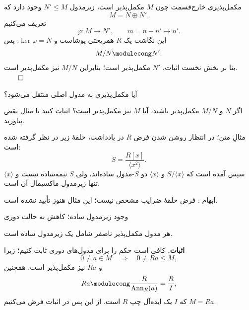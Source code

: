 \begin{frame}[t]{مکمل‌پذیری خارج‌قسمت}
    \label{lec06:complemented-quotient}
    چون \(M\) مکمل‌پذیر است، زیرمدول \(N'\leqslant M\) وجود دارد که
    \[
        M=N\oplus N'.
    \]
    تعریف می‌کنیم
    \[
        \varphi:M\longrightarrow N',\qquad m=n+n'\longmapsto n'.
    \]
    این نگاشت یک \(R\)-همریختی پوشاست و \(\ker\varphi=N\). پس
    \[
        M/N\modulecong N'.
    \]
    بنا بر بخش نخست اثبات، \(N'\) مکمل‌پذیر است؛ بنابراین \(M/N\) نیز مکمل‌پذیر است.
    \hfill\(\qed\)
\end{frame}

\begin{frame}[t]{آیا مکمل‌پذیری به مدول اصلی منتقل می‌شود؟}
    \label{lec06:extension-counterexample-pending}
    \begin{question}
        اگر \(N\) و \(M/N\) مکمل‌پذیر باشند، آیا \(M\) نیز مکمل‌پذیر است؟
        اثبات کنید یا مثال نقض بیاورید.
    \end{question}
    \begin{block}{مثالِ متن؛ در انتظار روشن شدن فرض \(R\)}
        در یادداشت، حلقهٔ زیر در نظر گرفته شده است:
        \[
            S=\frac{R[x]}{\langle x^2\rangle}.
        \]
        سپس آمده است که \(S/\langle x\rangle\) و \(\langle x\rangle\) دو
        \(S\)-مدول ساده‌اند، ولی \(S\) نیمه‌ساده نیست و \(\langle x\rangle\)
        تنها زیرمدول ماکسیمال آن است.
    \end{block}
    \alert{ابهام : فرض حلقهٔ ضرایب مشخص نیست؛ این مثال هنوز تأیید نشده است.}
\end{frame}

\begin{frame}[t]{وجود زیرمدول ساده؛ کاهش به حالت دوری}
    \label{lec06:simple-submodule-cyclic}
    \begin{theorem}
        هر مدول مکمل‌پذیر ناصفر شامل یک زیرمدول ساده است.
    \end{theorem}
    \textbf{اثبات.}
    کافی است حکم را برای مدول‌های دوری ثابت کنیم؛ زیرا
    \[
        0\neq a\in M\quad\Longrightarrow\quad 0\neq Ra\leqslant M,
    \]
    و \(Ra\) نیز مکمل‌پذیر است. همچنین
    \[
        Ra\modulecong\frac{R}{\operatorname{Ann}_R(a)}=\frac{R}{I},
    \]
    که \(I\) یک ایده‌آل چپ \(R\) است.
    از این پس در اثبات فرض می‌کنیم \(M=Ra\).
\end{frame}

